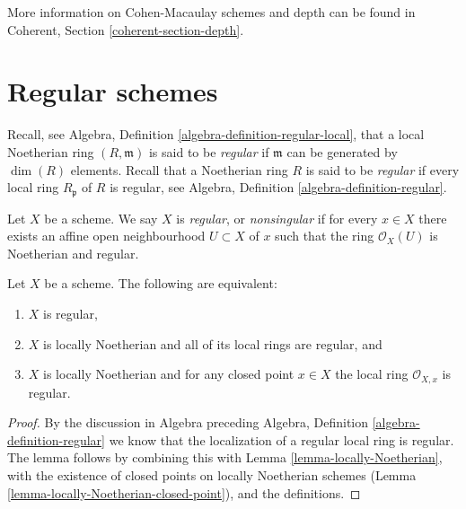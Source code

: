 \noindent
More information on Cohen-Macaulay schemes and depth can be found in
Coherent, Section \ref{coherent-section-depth}.








\section{Regular schemes}
\label{section-regular}

\noindent
Recall, see Algebra, Definition \ref{algebra-definition-regular-local},
that a local Noetherian ring $(R, \mathfrak m)$ is
said to be {\it regular} if $\mathfrak m$ can be generated
by $\dim(R)$ elements.
Recall that a Noetherian ring $R$ is said to be {\it regular} if
every local ring $R_{\mathfrak p}$ of $R$ is regular,
see Algebra, Definition \ref{algebra-definition-regular}.

\begin{definition}
\label{definition-regular}
Let $X$ be a scheme. We say $X$ is {\it regular}, or {\it nonsingular} if
for every $x \in X$ there exists an affine open neighbourhood
$U \subset X$ of $x$ such that the ring $\mathcal{O}_X(U)$ is
Noetherian and regular.
\end{definition}

\begin{lemma}
\label{lemma-characterize-regular}
Let $X$ be a scheme. The following are equivalent:
\begin{enumerate}
\item $X$ is regular,
\item $X$ is locally Noetherian and all of its local rings are regular,
and
\item $X$ is locally Noetherian and for any closed point $x \in X$
the local ring $\mathcal{O}_{X, x}$ is regular.
\end{enumerate}
\end{lemma}

\begin{proof}
By the discussion in Algebra preceding Algebra, Definition
\ref{algebra-definition-regular} we know that the localization of
a regular local ring is regular. The lemma follows
by combining this with Lemma \ref{lemma-locally-Noetherian},
with the existence of closed
points on locally Noetherian schemes
(Lemma \ref{lemma-locally-Noetherian-closed-point}), and
the definitions.
\end{proof}

